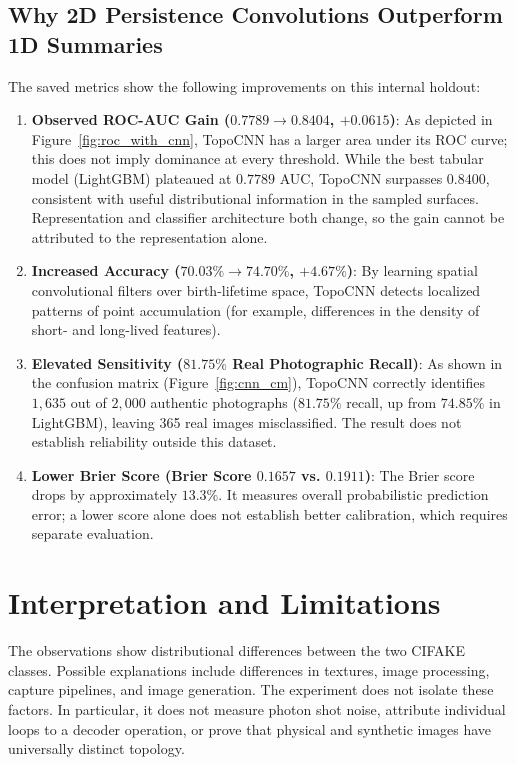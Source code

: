 \documentclass[11pt,a4paper]{article}
\begin{document}
\subsection{Why 2D Persistence Convolutions Outperform 1D Summaries}
The saved metrics show the following improvements on this internal holdout:
\begin{enumerate}
    \item \textbf{Observed ROC-AUC Gain ($0.7789 \to 0.8404$, $+0.0615$)}: As depicted in Figure~\ref{fig:roc_with_cnn}, TopoCNN has a larger area under its ROC curve; this does not imply dominance at every threshold. While the best tabular model (LightGBM) plateaued at $0.7789$ AUC, TopoCNN surpasses $0.8400$, consistent with useful distributional information in the sampled surfaces. Representation and classifier architecture both change, so the gain cannot be attributed to the representation alone.
    \item \textbf{Increased Accuracy ($70.03\% \to 74.70\%$, $+4.67\%$)}: By learning spatial convolutional filters over birth-lifetime space, TopoCNN detects localized patterns of point accumulation (for example, differences in the density of short- and long-lived features).
    \item \textbf{Elevated Sensitivity ($81.75\%$ Real Photographic Recall)}: As shown in the confusion matrix (Figure~\ref{fig:cnn_cm}), TopoCNN correctly identifies $1{,}635$ out of $2{,}000$ authentic photographs ($81.75\%$ recall, up from $74.85\%$ in LightGBM), leaving 365 real images misclassified. The result does not establish reliability outside this dataset.
    \item \textbf{Lower Brier Score (Brier Score $0.1657$ vs. $0.1911$)}: The Brier score drops by approximately $13.3\%$. It measures overall probabilistic prediction error; a lower score alone does not establish better calibration, which requires separate evaluation.
\end{enumerate}

\section{Interpretation and Limitations}
The observations show distributional differences between the two CIFAKE classes. Possible explanations include differences in textures, image processing, capture pipelines, and image generation. The experiment does not isolate these factors. In particular, it does not measure photon shot noise, attribute individual loops to a decoder operation, or prove that physical and synthetic images have universally distinct topology.
\end{document}

